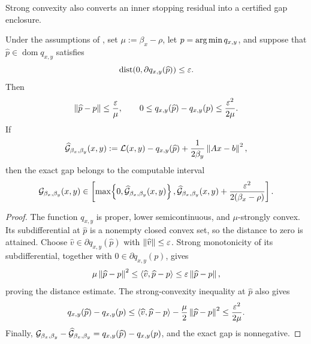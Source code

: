 Strong convexity also converts an inner stopping residual into a certified
gap enclosure.
\begin{lemma}
  \label{lem:inexact-safe-prox}
  Under the assumptions of , set
  \(\mu:=\beta_x-\rho\), let \(p=\operatorname*{arg\,min} q_{x,y}\), and suppose that
  \(\widehat p\in\operatorname{dom}q_{x,y}\) satisfies
  \[
    \operatorname{dist}\!\left(0,\partial q_{x,y}(\widehat p)\right)
    \le\varepsilon .
  \]
  Then
  \begin{equation}
    \left\lVert \widehat p-p\right\rVert
    \le\frac{\varepsilon}{\mu},
    \qquad
    0\le q_{x,y}(\widehat p)-q_{x,y}(p)
    \le\frac{\varepsilon^2}{2\mu}.
    \label{eq:inexact-prox-bounds}
  \end{equation}
  If
  \begin{equation}
    \widehat{\mathcal G}_{\beta_x,\beta_y}(x,y)
    :=
    \mathcal{L}(x,y)-q_{x,y}(\widehat p)
    +\frac{1}{2\beta_y}\left\lVert Ax-b\right\rVert^{2},
    \label{eq:inexact-sdg}
  \end{equation}
  then the exact gap belongs to the computable interval
  \begin{equation}
    \mathcal{G}_{\beta_x,\beta_y}(x,y)
    \in
    \left[
      \max\!\left\{0,\widehat{\mathcal G}_{\beta_x,\beta_y}(x,y)\right\},
      \widehat{\mathcal G}_{\beta_x,\beta_y}(x,y)
      +\frac{\varepsilon^2}{2(\beta_x-\rho)}
    \right].
    \label{eq:inexact-sdg-enclosure}
  \end{equation}
\end{lemma}

\begin{proof}
  The function \(q_{x,y}\) is proper, lower semicontinuous, and
  \(\mu\)-strongly convex.  Its subdifferential at \(\widehat p\) is a
  nonempty closed convex set, so the distance to zero is attained.  Choose
  \(\widehat v\in\partial q_{x,y}(\widehat p)\) with
  \(\left\lVert \widehat v\right\rVert\le\varepsilon\).  Strong monotonicity of its
  subdifferential, together with \(0\in\partial q_{x,y}(p)\), gives
  \[
    \mu\left\lVert \widehat p-p\right\rVert^{2}
    \le\left\langle \widehat v,\widehat p-p\right\rangle
    \le\varepsilon\left\lVert \widehat p-p\right\rVert,
  \]
  proving the distance estimate.  The strong-convexity inequality at
  \(\widehat p\) also gives
  \[
    q_{x,y}(\widehat p)-q_{x,y}(p)
    \le
    \left\langle \widehat v,\widehat p-p\right\rangle
    -\frac{\mu}{2}\left\lVert \widehat p-p\right\rVert^{2}
    \le\frac{\varepsilon^2}{2\mu}.
  \]
  Finally,
  \(\mathcal{G}_{\beta_x,\beta_y}-\widehat{\mathcal G}_{\beta_x,\beta_y}
    =q_{x,y}(\widehat p)-q_{x,y}(p)\), and the exact gap is nonnegative.
\end{proof}

